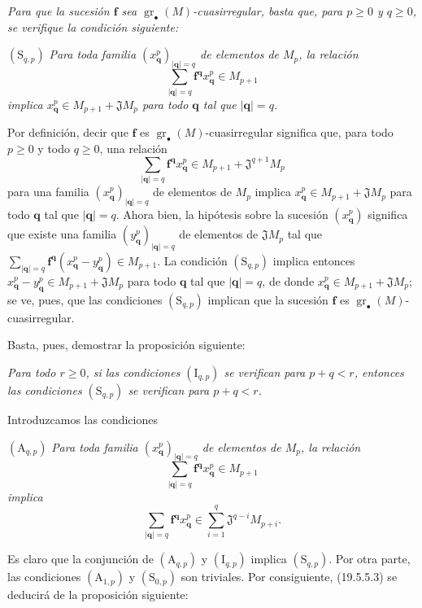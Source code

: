 \begin{env}[19.5.5.2]
\label{IV.19.5.5.2}
\emph{Para que la sucesión $\mathbf f$ sea $\operatorname{gr}_\bullet(M)$-cuasirregular, basta que, para $p\geq0$ y $q\geq0$, se verifique la condición siguiente:}

$(\mathrm S_{q,p})$ \emph{Para toda familia $(x_{\mathbf q}^p)_{|\mathbf q|=q}$ de elementos de $M_p$, la relación}
\[
  \sum_{|\mathbf q|=q}\mathbf f^{\mathbf q}x_{\mathbf q}^p\in M_{p+1}
\]
\emph{implica $x_{\mathbf q}^p\in M_{p+1}+\mathfrak JM_p$ para todo $\mathbf q$ tal que $|\mathbf q|=q$.}

Por definición, decir que $\mathbf f$ es $\operatorname{gr}_\bullet(M)$-cuasirregular significa que, para todo $p\geq0$ y todo $q\geq0$, una relación
\[
  \sum_{|\mathbf q|=q}\mathbf f^{\mathbf q}x_{\mathbf q}^p\in M_{p+1}+\mathfrak J^{q+1}M_p
\]
para una familia $(x_{\mathbf q}^p)_{|\mathbf q|=q}$ de elementos de $M_p$ implica $x_{\mathbf q}^p\in M_{p+1}+\mathfrak JM_p$ para todo $\mathbf q$ tal que $|\mathbf q|=q$. Ahora bien, la hipótesis sobre la sucesión $(x_{\mathbf q}^p)$ significa que existe una familia $(y_{\mathbf q}^p)_{|\mathbf q|=q}$ de elementos de $\mathfrak JM_p$ tal que $\sum_{|\mathbf q|=q}\mathbf f^{\mathbf q}(x_{\mathbf q}^p-y_{\mathbf q}^p)\in M_{p+1}$. La condición $(\mathrm S_{q,p})$ implica entonces $x_{\mathbf q}^p-y_{\mathbf q}^p\in M_{p+1}+\mathfrak JM_p$ para todo $\mathbf q$ tal que $|\mathbf q|=q$, de donde $x_{\mathbf q}^p\in M_{p+1}+\mathfrak JM_p$; se ve, pues, que las condiciones $(\mathrm S_{q,p})$ implican que la sucesión $\mathbf f$ es $\operatorname{gr}_\bullet(M)$-cuasirregular.
\end{env}

Basta, pues, demostrar la proposición siguiente:

\begin{env}[19.5.5.3]
\label{IV.19.5.5.3}
\emph{Para todo $r\geq0$, si las condiciones $(\mathrm I_{q,p})$ se verifican para $p+q<r$, entonces las condiciones $(\mathrm S_{q,p})$ se verifican para $p+q<r$.}

Introduzcamos las condiciones

$(\mathrm A_{q,p})$ \emph{Para toda familia $(x_{\mathbf q}^p)_{|\mathbf q|=q}$ de elementos de $M_p$, la relación}
\[
  \sum_{|\mathbf q|=q}\mathbf f^{\mathbf q}x_{\mathbf q}^p\in M_{p+1}
\]
\emph{implica}
\[
  \sum_{|\mathbf q|=q}\mathbf f^{\mathbf q}x_{\mathbf q}^p\in\sum_{i=1}^q\mathfrak J^{q-i}M_{p+i}.
\]

Es claro que la conjunción de $(\mathrm A_{q,p})$ y $(\mathrm I_{q,p})$ implica $(\mathrm S_{q,p})$. Por otra parte, las condiciones $(\mathrm A_{1,p})$ y $(\mathrm S_{0,p})$ son triviales. Por consiguiente, (19.5.5.3) se deducirá de la proposición siguiente:
\end{env}


